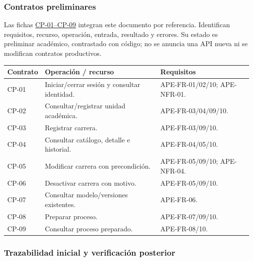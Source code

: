 \documentclass[11pt,a4paper]{article}
\begin{document}
\subsubsection{Contratos preliminares}\label{contratos-preliminares}

Las fichas \href{CONTRATOS_PRELIMINARES.md}{CP-01--CP-09} integran este
documento por referencia. Identifican requisitos, recurso, operación,
entrada, resultado y errores. Su estado es preliminar académico,
contrastado con código; no se anuncia una API nueva ni se modifican
contratos productivos.

{\def\LTcaptype{none} %
\begin{longtable}[]{@{}
  >{\raggedright\arraybackslash}p{}
  >{\raggedright\arraybackslash}p{}
  >{\raggedright\arraybackslash}p{}@{}}
\toprule\noalign{}
\begin{minipage}[b]{\linewidth}\raggedright
Contrato
\end{minipage} & \begin{minipage}[b]{\linewidth}\raggedright
Operación / recurso
\end{minipage} & \begin{minipage}[b]{\linewidth}\raggedright
Requisitos
\end{minipage} \\
\midrule\noalign{}
\endhead
\bottomrule\noalign{}
\endlastfoot
CP-01 & Iniciar/cerrar sesión y consultar identidad. & APE-FR-01/02/10;
APE-NFR-01. \\
CP-02 & Consultar/registrar unidad académica. & APE-FR-03/04/09/10. \\
CP-03 & Registrar carrera. & APE-FR-03/09/10. \\
CP-04 & Consultar catálogo, detalle e historial. & APE-FR-04/05/10. \\
CP-05 & Modificar carrera con precondición. & APE-FR-05/09/10;
APE-NFR-04. \\
CP-06 & Desactivar carrera con motivo. & APE-FR-05/09/10. \\
CP-07 & Consultar modelo/versiones existentes. & APE-FR-06. \\
CP-08 & Preparar proceso. & APE-FR-07/09/10. \\
CP-09 & Consultar proceso preparado. & APE-FR-08/10. \\
\end{longtable}
}

\subsubsection{Trazabilidad inicial y verificación
posterior}\label{trazabilidad-inicial-y-verificaciuxf3n-posterior}
\end{document}
